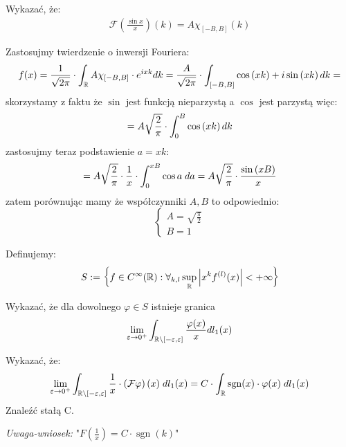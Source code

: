 \documentclass[11pt]{scrartcl}
\DeclareMathOperator{\sgn}{sgn}
\begin{document}
    \newpage

    \begin{zadanie*}
        Wykazać, że:
        \begin{gather*}
            \mathcal{F} \left ( \frac{\sin x}{x} \right ) (k) = A \chi_{[- B, B]} (k)
        \end{gather*}
    \end{zadanie*}

    Zastosujmy twierdzenie o inwersji Fouriera:
    \[
        f(x) = \frac{1}{\sqrt{2 \pi } } \cdot \int_{\mathbb R} A \chi_{[-B, B]} \cdot e^{i x k} dk = 
        \frac{A}{\sqrt{2 \pi } } \cdot \int_{[-B, B]} \cos \left ( x k \right ) + i \sin \left ( x k \right ) dk =
    \]
    skorzystamy z faktu że $\sin$ jest funkcją nieparzystą a $\cos$ jest parzystą więc:
    \[
        = A \sqrt{\frac{2}{\pi }}  \cdot \int_0^B \cos \left ( x k \right ) dk
    \]
    zastosujmy teraz podstawienie $a = x k$:
    \[
        = A \sqrt{\frac{2}{\pi }}  \cdot \frac{1}{x} \cdot \int_0^{x B} \cos a \; da 
        = A \sqrt{\frac{2}{\pi }}  \cdot \frac{\sin \left ( x B \right )}{x}
    \]
    zatem porównując mamy że współczynniki $A, B$ to odpowiednio:
    \[
        \begin{cases}
            A = \sqrt{\frac{\pi }{2}} \\
            B = 1
        \end{cases}
    \]

    \newpage

    \begin{zadanie*}
        Definujemy:
        \[
            S := \left \{ f \in C^{\infty } (\mathbb R) : 
                \forall_{k,l} \sup_{\mathbb R} \left\lvert x^k f^{(l)} (x) \right\rvert < + \infty   \right \}
        \]

        \begin{walk}
            \item Wykazać, że dla dowolnego $\varphi \in S$ istnieje granica
                \[
                    \lim_{\varepsilon \to 0^+} \int_{\mathbb R \backslash [-\varepsilon, \varepsilon]} 
                        \frac{\varphi (x)}{x} dl_1 (x)  
                \]
            \item Wykazać, że:
                \[
                     \lim_{\varepsilon \to 0^+} \int_{\RR \backslash [-\varepsilon, \varepsilon]} 
                         \frac{1}{x} \cdot \left ( \mathcal{F} \varphi  \right ) (x) \; dl_1 (x) =
                         C \cdot \int_{\RR} \sgn (x) \cdot \varphi (x) \; dl_1(x)
                \]
                Znaleźć stałą C.
        \end{walk}

        \textit{Uwaga-wniosek:} "$F \left ( \frac{1}{x} \right ) = C \cdot \sgn (k)$" 
    \end{zadanie*}
    
\end{document}
